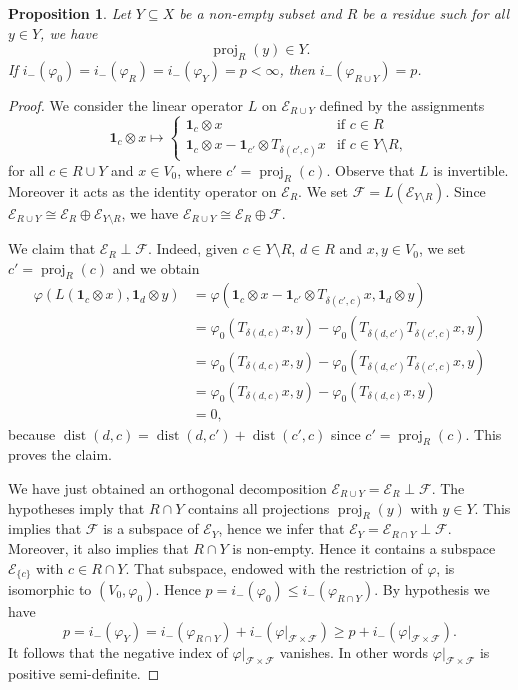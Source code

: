 \documentclass[12pt,a4paper]{amsproc}
\newtheorem{proposition}[theorem]{Proposition}
\theoremstyle{definition}
\DeclareMathOperator{\proj}{proj}
\DeclareMathOperator{\dist}{dist}
\newcommand{\one}{\mathbf 1}
\begin{document}
\begin{proposition}\label{prop:add-residue}
Let $Y \subseteq X$ be a non-empty subset and $R$ be a residue such for all $y \in Y$, we have 
$$\proj_R(y) \in Y.$$
If $i_-(\varphi_0) = i_-(\varphi_R) = i_-(\varphi_Y) = p< \infty$, then $i_-(\varphi_{R \cup Y}) = p$.
\end{proposition}
\begin{proof}
We consider the linear operator $L$ on $\mathscr E_{R \cup Y}$ defined by the assignments
$$\one_c \otimes x \mapsto \left\{
\begin{array}{ll}
\one_c \otimes x & \text{if } c \in R\\
\one_c  \otimes x - \one_{c'} \otimes  T_{\delta(c', c)}x & \text{if } c \in Y \setminus R,
\end{array}
\right.
$$
for all $c \in R \cup Y$ and $x \in V_0$, where $c' = \proj_R(c)$. Observe that $L$ is invertible. Moreover it acts  as the identity operator on $\mathscr E_R$. We set $\mathscr F = L(\mathscr E_{Y \setminus R})$. Since $\mathscr E_{R \cup Y} \cong \mathscr E_{R} \oplus \mathscr E_{Y \setminus R} $, we have $\mathscr E_{R \cup Y} \cong \mathscr E_{R} \oplus \mathscr F$.

We claim that $\mathscr E_R \perp \mathscr F$. Indeed, given $c \in Y \setminus R$, $d \in R$ and $x, y \in V_0$, we set $c' = \proj_R(c)$ and we obtain 
\begin{align*}
\varphi(L(\one_c \otimes x), \one_d \otimes y) 
&= \varphi(\one_c \otimes x -  \one_{c'} \otimes T_{\delta(c', c)}x, \one_d \otimes y) \\
&= \varphi_0(T_{\delta(d, c)}x, y) - \varphi_0(T_{\delta(d, c')} T_{\delta(c', c)}x, y)\\
&= \varphi_0(T_{\delta(d, c)}x, y) - \varphi_0(T_{\delta(d, c')} T_{\delta(c', c)}x, y)\\
&= \varphi_0(T_{\delta(d, c)}x, y) - \varphi_0(T_{\delta(d,   c)}x, y)\\
&=0,
\end{align*}
because $\dist(d, c) = \dist(d, c') +\dist(c', c)$ since 	 $c' = \proj_R(c)$. This proves the claim. 

We have just obtained an orthogonal decomposition  $\mathscr E_{R \cup Y} = \mathscr E_R \perp  \mathscr F$.  The hypotheses imply that $R \cap Y$ contains all projections $\proj_R(y)$ with $y \in Y$. This implies that $\mathscr F$ is a subspace of $\mathscr E_Y$, hence we infer that $\mathscr E_Y = \mathscr E_{R \cap Y}  \perp \mathscr F$. Moreover, it also implies that $R \cap Y$ is non-empty. Hence it contains a subspace $\mathscr E_{\{c\}}$ with $c \in R \cap Y$. That subspace, endowed with the restriction of $\varphi$,  is isomorphic to $(V_0, \varphi_0)$. Hence $p = i_-(\varphi_0) \leq i_-(\varphi_{R \cap Y})$. By hypothesis we have
$$p = i_-(\varphi_Y) =   i_-(\varphi_{R \cap Y}) + i_-(\varphi|_{\mathscr F \times \mathscr F}) \geq p + i_-(\varphi|_{\mathscr F \times \mathscr F}). $$
It follows that the negative index of $\varphi|_{\mathscr F \times \mathscr F}$ vanishes. In other words $\varphi|_{\mathscr F \times \mathscr F}$  is positive semi-definite.


\end{proof}
\end{document}
